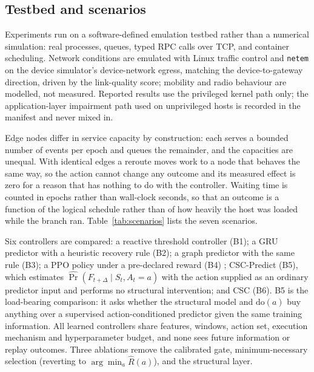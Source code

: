 \documentclass[journal]{IEEEtran}
\begin{document}
\subsection{Testbed and scenarios}
Experiments run on a software-defined emulation testbed rather than a numerical
simulation: real processes, queues, typed RPC calls over TCP, and container
scheduling. Network conditions are emulated with Linux traffic control and
\texttt{netem} on the device simulator's device-network egress, matching the
device-to-gateway direction, driven by the link-quality score; mobility and radio behaviour
are modelled, not measured. Reported results use the privileged kernel path
only; the application-layer impairment path used on unprivileged hosts is
recorded in the manifest and never mixed in.

Edge nodes differ in service capacity by construction: each serves a bounded
number of events per epoch and queues the remainder, and the capacities are
unequal. With identical edges a reroute moves work to a node that behaves the
same way, so the action cannot change any outcome and its measured effect is
zero for a reason that has nothing to do with the controller. Waiting time is
counted in epochs rather than wall-clock seconds, so that an outcome is a
function of the logical schedule rather than of how heavily the host was loaded
while the branch ran. Table~\ref{tab:scenarios} lists the seven scenarios.

Six controllers are compared: a reactive threshold controller (B1); a GRU
predictor with a heuristic recovery rule (B2); a graph predictor with the same
rule (B3); a PPO policy under a pre-declared reward (B4)
\cite{schulman2017ppo}; CSC-Predict (B5), which estimates
$\hat{\Pr}(F_{t+\Delta}\mid S_t, A_t\!=\!a)$ with the action supplied as an
ordinary predictor input and performs no structural intervention; and CSC (B6).
B5 is the load-bearing comparison: it asks whether the structural model and
$\mathrm{do}(a)$ buy anything over a supervised action-conditioned predictor
given the same training information. All learned controllers share features,
windows, action set, execution mechanism and hyperparameter budget, and none
sees future information or replay outcomes. Three ablations remove the
calibrated gate, minimum-necessary selection (reverting to
$\arg\min_a \hat R(a)$), and the structural layer.
\end{document}
